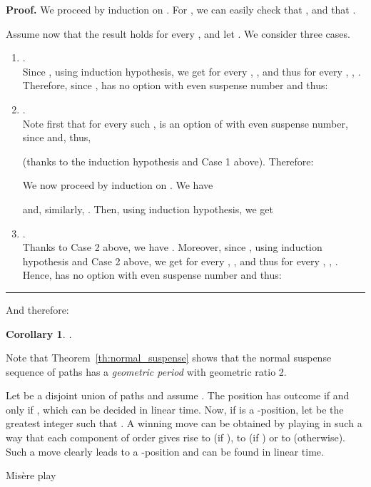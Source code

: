 \documentclass[11pt]{article}
\newcommand{\centre}[1]{\begin{center}#1\end{center}}
\newtheorem{corollary}[theorem]{Corollary}
\newcommand\qed{\mbox{}\hfill\rule{0.5em}{0.809em}\par\vskip 5mm}
\newenvironment{proof}[0]{\noindent\textbf{Proof.}}{\qed}
\begin{document}
\begin{proof}
We proceed by induction on .
For , we can easily check that 
,  and that .

Assume now that the result holds for every ,  and let
. 
We consider three cases.

\begin{enumerate}
\item .\\
Since , 
using induction hypothesis, we get
 for every , ,
and thus  for every ,
, .
Therefore, since ,  has no option
with even suspense number and thus:


\item .\\
Note first that for every such ,
 is an option of  with
even suspense number, since  and, thus, 

(thanks to the induction hypothesis and Case 1 above).
Therefore:

We now proceed by induction on .
We have

and, similarly, .
Then, using induction hypothesis, we get


\item .\\
Thanks to Case 2 above, we have .
Moreover, 
since , 
using induction hypothesis and Case 2 above, we get
 for every , ,
and thus  for every ,
, .
Hence,  has no option
with even suspense number and thus:


\end{enumerate}
\end{proof}

And therefore:

\begin{corollary}
.
\end {corollary}

Note that Theorem~\ref{th:normal_suspense} shows that the normal
suspense sequence of paths has a {\em geometric period} with
geometric ratio 2.

Let  be a disjoint union
of paths and assume .
The position  has outcome  if and only if , which
can be decided in linear time.
Now, if  is a -position,
let  be the greatest integer such that .
A winning move can be obtained by playing in such a way that each component of
order  gives rise to  (if ), to  (if )
or to  (otherwise). Such a move clearly leads to a
-position and can be found in linear time.

\vskip 4mm

\centre{{\sc Mis\`ere play}}
\end{document}
